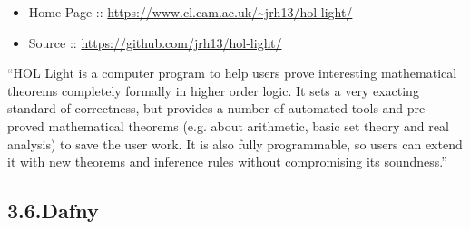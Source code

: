 \documentclass[12pt,twoside]{article}
\begin{document}
\begin{itemize}[noitemsep,topsep=\mdcompacttopsep]%

\item{}Home Page :: \href{https://www.cl.cam.ac.uk/~jrh13/hol-light/}{{\ttfamily https://\hspace{0pt}www.\hspace{0pt}cl.\hspace{0pt}cam.\hspace{0pt}ac.\hspace{0pt}uk/\hspace{0pt}\textasciitilde{}jrh13/\hspace{0pt}hol-\hspace{0pt}light/\hspace{0pt}}}%

\item{}Source :: \href{https://github.com/jrh13/hol-light/}{{\ttfamily https://\hspace{0pt}github.\hspace{0pt}com/\hspace{0pt}jrh13/\hspace{0pt}hol-\hspace{0pt}light/\hspace{0pt}}}%
\end{itemize}%

\noindent{}\textquotedblleft{}HOL Light is a computer program to help users prove interesting
mathematical theorems completely formally in higher order logic. It
sets a very exacting standard of correctness, but provides a number of
automated tools and pre-proved mathematical theorems (e.g. about
arithmetic, basic set theory and real analysis) to save the user
work. It is also fully programmable, so users can extend it with new
theorems and inference rules without compromising its soundness.\textquotedblright{}%

\subsection{3.6.\hspace*{0.5em}Dafny}\label{sec-dafny}%
\end{document}
